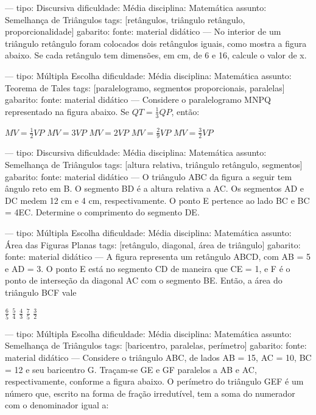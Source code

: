 ---
tipo: Discursiva
dificuldade: Média
disciplina: Matemática
assunto: Semelhança de Triângulos
tags: [retângulos, triângulo retângulo, proporcionalidade]
gabarito:
fonte: material didático
---
\question
No interior de um triângulo retângulo foram colocados dois retângulos iguais, como mostra a figura abaixo. Se cada retângulo tem dimensões, em cm, de 6 e 16, calcule o valor de x.


---
tipo: Múltipla Escolha
dificuldade: Média
disciplina: Matemática
assunto: Teorema de Tales
tags: [paralelogramo, segmentos proporcionais, paralelas]
gabarito:
fonte: material didático
---
\question
Considere o paralelogramo MNPQ representado na figura abaixo.
Se $QT = \frac{1}{3}QP$, então:
\begin{choices}
\choice $MV = \frac{1}{2}VP$
\choice $MV = 3VP$
\choice $MV = 2VP$
\choice $MV = \frac{2}{9}VP$
\choice $MV = \frac{3}{2}VP$
\end{choices}


---
tipo: Discursiva
dificuldade: Média
disciplina: Matemática
assunto: Semelhança de Triângulos
tags: [altura relativa, triângulo retângulo, segmentos]
gabarito:
fonte: material didático
---
\question
O triângulo ABC da figura a seguir tem ângulo reto em B. O segmento BD é a altura relativa a AC. Os segmentos AD e DC medem 12 cm e 4 cm, respectivamente. O ponto E pertence ao lado BC e BC = 4EC.
Determine o comprimento do segmento DE.


---
tipo: Múltipla Escolha
dificuldade: Média
disciplina: Matemática
assunto: Área das Figuras Planas
tags: [retângulo, diagonal, área de triângulo]
gabarito:
fonte: material didático
---
\question
A figura representa um retângulo ABCD, com AB = 5 e AD = 3. O ponto E está no segmento CD de maneira que CE = 1, e F é o ponto de interseção da diagonal AC com o segmento BE. Então, a área do triângulo BCF vale
\begin{choices}
\choice $\frac{6}{5}$
\choice $\frac{5}{4}$
\choice $\frac{4}{3}$
\choice $\frac{7}{5}$
\choice $\frac{3}{2}$
\end{choices}


---
tipo: Múltipla Escolha
dificuldade: Média
disciplina: Matemática
assunto: Semelhança de Triângulos
tags: [baricentro, paralelas, perímetro]
gabarito:
fonte: material didático
---
\question
Considere o triângulo ABC, de lados AB = 15, AC = 10, BC = 12 e seu baricentro G. Traçam-se GE e GF paralelos a AB e AC, respectivamente, conforme a figura abaixo. O perímetro do triângulo GEF é um número que, escrito na forma de fração irredutível, tem a soma do numerador com o denominador igual a:
\begin{choices}
\end{choices}

